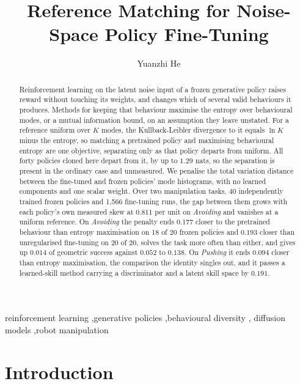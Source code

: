 \documentclass[preprint,12pt]{elsarticle}
\begin{document}
\begin{frontmatter}

\title{Reference Matching for Noise-Space Policy Fine-Tuning}

\author{Yuanzhi He}

\begin{abstract}
Reinforcement learning on the latent noise input of a frozen generative policy
raises reward without touching its weights, and changes which of several valid
behaviours it produces. Methods for keeping that behaviour maximise the entropy
over behavioural modes, or a mutual information bound, on an assumption they
leave unstated. For a reference uniform over $K$ modes, the Kullback-Leibler
divergence to it equals $\ln K$ minus the entropy, so matching a pretrained
policy and maximising behavioural entropy are one objective, separating only as
that policy departs from uniform. All forty policies cloned here depart from it,
by up to $1.29$ nats, so the separation is present in the ordinary case and
unmeasured. We penalise the total variation distance between the fine-tuned and
frozen policies' mode histograms, with no learned components and one scalar
weight. Over two manipulation tasks, 40 independently trained frozen policies
and 1,566 fine-tuning runs, the gap between them grows with each policy's own
measured skew at $0.811$ per unit on \emph{Avoiding} and vanishes at a uniform
reference. On \emph{Avoiding} the penalty ends $0.177$ closer to the pretrained
behaviour than entropy maximisation on 18 of 20 frozen policies and $0.193$
closer than unregularised fine-tuning on 20 of 20, solves the task more often
than either, and gives up $0.014$ of geometric success against $0.052$ to
$0.138$. On \emph{Pushing} it ends $0.094$ closer than entropy maximisation,
the comparison the identity singles out, and it passes a learned-skill method
carrying a discriminator and a latent skill space by $0.191$.
\end{abstract}

\begin{keyword}
reinforcement learning \sep generative policies \sep behavioural diversity \sep
diffusion models \sep robot manipulation
\end{keyword}

\end{frontmatter}

\section{Introduction}\label{sec:intro}
\end{document}
